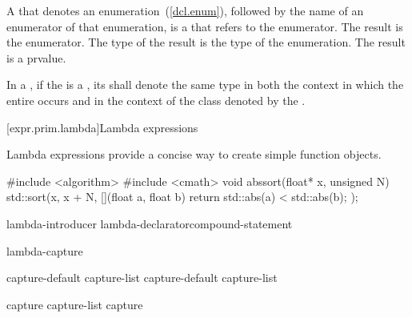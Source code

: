 \pnum
A  that denotes an
enumeration~(\ref{dcl.enum}), followed by the name of an
enumerator of that enumeration, is a 
that refers to the enumerator. The result is the enumerator. The type
of the result is the type of the enumeration. The result is a prvalue.

\pnum
In a , if the
is a
, its 
shall denote the same type in both the context in which the entire
 occurs and in the context of the class denoted
by the .

[expr.prim.lambda]{Lambda expressions}%

\pnum
Lambda expressions provide a concise way to create simple function objects.
\begin{example}

\begin{codeblock}
#include <algorithm>
#include <cmath>
void abssort(float* x, unsigned N) {
  std::sort(x, x + N,
    [](float a, float b) {
      return std::abs(a) < std::abs(b);
    });
}
\end{codeblock}
\end{example}

\begin{bnf}
\br
    lambda-introducer lambda-declarator\opt compound-statement
\end{bnf}

\begin{bnf}
\br
    \terminal{[} lambda-capture\opt{} \terminal{]}
\end{bnf}

\begin{bnf}
\br
    capture-default\br
    capture-list\br
    capture-default \terminal{,} capture-list
\end{bnf}

\begin{bnf}
\br
    \terminal{\&}\br
    \terminal{=}
\end{bnf}

\begin{bnf}
\br
    capture \br
    capture-list \terminal{,} capture 
\end{bnf}

